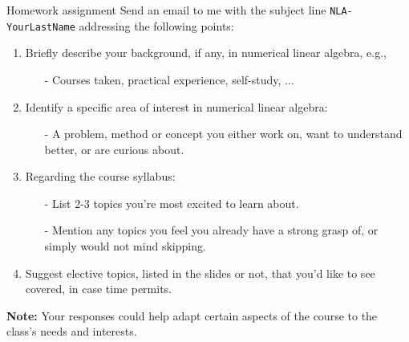 \documentclass[t,usepdftitle=false]{beamer}
\begin{document}
\begin{frame}{Homework assignment}
Send an email to me with the subject line \texttt{NLA-YourLastName} addressing the following points:\vspace{.1cm}
\begin{enumerate}
\item Briefly describe your background, if any, in numerical linear algebra, e.g.,
    \begin{itemize}\normalsize
    \item[-] Courses taken, practical experience, self-study, ...
    \end{itemize}
\item Identify a specific area of interest in numerical linear algebra:
    \begin{itemize}\normalsize
    \item[-] A problem, method or concept you either work on, want to understand better, or are curious about.
    \end{itemize}
\item Regarding the course syllabus:
    \begin{itemize}\normalsize
    \item[-] List 2-3 topics you're most excited to learn about.
    \item[-] Mention any topics you feel you already have a strong grasp of, or simply would not mind skipping.
    \end{itemize}
\item Suggest elective topics, listed in the slides or not, that you'd like to see covered, in case time permits.
\end{enumerate}
\textbf{Note:} Your responses could help adapt certain aspects of the course to the class's needs and interests.
\end{frame}
\end{document}
